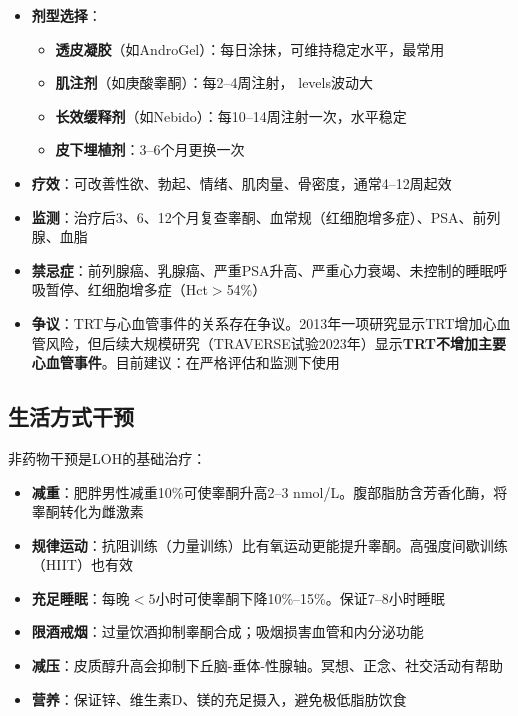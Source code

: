 \begin{itemize}[leftmargin=2cm]
	\item \textbf{剂型选择}：
		\begin{itemize}
		\item \textbf{透皮凝胶}（如AndroGel）：每日涂抹，可维持稳定水平，最常用
		\item \textbf{肌注剂}（如庚酸睾酮）：每2--4周注射， levels波动大
		\item \textbf{长效缓释剂}（如Nebido）：每10--14周注射一次，水平稳定
		\item \textbf{皮下埋植剂}：3--6个月更换一次
		\end{itemize}
	\item \textbf{疗效}：可改善性欲、勃起、情绪、肌肉量、骨密度，通常4--12周起效
	\item \textbf{监测}：治疗后3、6、12个月复查睾酮、血常规（红细胞增多症）、PSA、前列腺、血脂
	\item \textbf{禁忌症}：前列腺癌、乳腺癌、严重PSA升高、严重心力衰竭、未控制的睡眠呼吸暂停、红细胞增多症（Hct$>$54\%）
	\item \textbf{争议}：TRT与心血管事件的关系存在争议。2013年一项研究显示TRT增加心血管风险，但后续大规模研究（TRAVERSE试验2023年）显示\textbf{TRT不增加主要心血管事件}。目前建议：在严格评估和监测下使用
\end{itemize}

\subsection{生活方式干预}

非药物干预是LOH的基础治疗：

\begin{itemize}[leftmargin=2cm]
	\item \textbf{减重}：肥胖男性减重10\%可使睾酮升高2--3 nmol/L。腹部脂肪含芳香化酶，将睾酮转化为雌激素
	\item \textbf{规律运动}：抗阻训练（力量训练）比有氧运动更能提升睾酮。高强度间歇训练（HIIT）也有效
	\item \textbf{充足睡眠}：每晚$<5$小时可使睾酮下降10\%--15\%。保证7--8小时睡眠
	\item \textbf{限酒戒烟}：过量饮酒抑制睾酮合成；吸烟损害血管和内分泌功能
	\item \textbf{减压}：皮质醇升高会抑制下丘脑-垂体-性腺轴。冥想、正念、社交活动有帮助
	\item \textbf{营养}：保证锌、维生素D、镁的充足摄入，避免极低脂肪饮食
\end{itemize}


